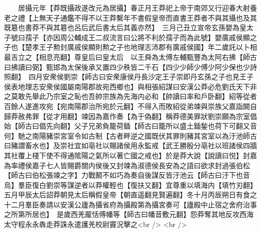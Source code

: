 　　居攝元年【莽既攝政遂改元為居攝】春正月王莽祀上帝于南郊又行迎春大射養老之禮【上無天子通鑑不得不以王莽繫年不書假皇帝而直書王莽者不與其攝也及其既簒也書莽不與其簒也呂后武后書太后其義亦然】　三月己丑立宣帝玄孫嬰為皇太子號曰孺子【亦因周公輔成王二叔流言曰公將不利於孺子而為此號】嬰廣戚侯顯之子也【楚孝王子勲封廣戚侯顯則勲之子也地理志沛郡有廣戚侯國】年二歲託以卜相最吉立之【相息亮翻】尊皇后曰皇太后　以王舜為太傅左輔甄豐為太阿右拂【師古曰拂讀曰弼】甄邯為太保後承又置四少秩皆二千石【四少少師少傅少阿少保也少詩照翻】　四月安衆侯劉崇【師古曰安衆康侯丹長沙定王子崇即丹玄孫之子也見王子侯表地理志安衆侯國屬南陽郡故宛西鄉也】與相張紹謀曰安漢公莽必危劉氏天下非之莫敢先舉此乃宗室之恥也吾帥宗族為先海内必和【帥讀曰率和戶卧翻】紹等從者百餘人遂進攻宛【宛南陽郡治所宛於元翻】不得入而敗紹從弟竦與崇族父嘉詣闕自歸莽赦弗罪【從才用翻】竦因為嘉作奏【為于偽翻】稱莽德美罪狀劉崇願為宗室倡始【師古曰倡先向翻】父子兄弟負籠荷鍤【師古曰籠所以盛土鍤鍫也荷下可翻又音何】馳之南陽豬崇宮室令如古制【古者畔逆之國既伏其罪則豬其宮室以為汙池師古曰豬謂畜水也】及崇社宜如亳社以賜諸侯用永監戒【武王勝殷分亳社以班諸侯四牆其社覆上棧下使不得通隂陽之氣所以著亡國之戒也】於是莽大說【說讀曰悦】封嘉為率禮侯嘉子七人皆賜爵關内侯後又封竦為淑德侯長安為之語曰欲求封過張伯松【師古曰伯松張竦之字】力戰鬭不如巧為奏自後謀反皆汙池云【師古曰汙下也音烏】羣臣復白劉崇等謀逆者以莽權輕也【復扶又翻】宜尊重以填海内【填竹刃翻】五月甲辰太后詔莽朝見太后稱假皇帝【朝直遥翻見賢遍翻】冬十月丙辰朔日有食之　十二月羣臣奏請以安漢公廬為攝省府為攝殿第為攝宮奏可【廬殿中止宿之舍府治事之所第所居也】　是歲西羌龎恬傅幡等【師古曰幡音敷元翻】怨莽奪其地反攻西海太守程永永犇走莽誅永遣護羌校尉竇況擊之<br />
<br />
